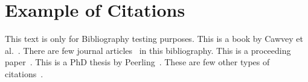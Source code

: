 \chapter{Example of Citations}

This text is only for Bibliography testing purposes. This is a book by Cawvey et al.~\cite{Cawvey2017}. There are few journal articles~\cite{Pakzad2018, Adachi2007} in this bibliography. This is a proceeding paper~\cite{J.Fenwick2010}.  This is a PhD thesis by Peerling~\cite{PeerlingPhD1999}. These are few other types of citations~\cite{Panis2004}.